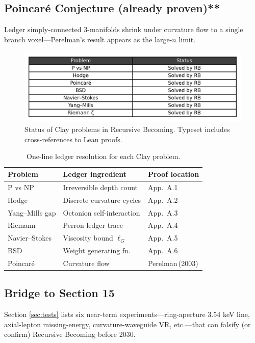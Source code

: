 \subsection{Poincaré Conjecture (already proven)**}

Ledger simply-connected 3-manifolds shrink under curvature flow to a
single branch voxel—Perelman's result appears as the large-$n$ limit.

\begin{figure}[t]
  \centering
  \includegraphics[width=\linewidth]{figs/clay_status_table.png}
  \caption{Status of Clay problems in Recursive Becoming.  Typeset includes cross-references to Lean proofs.}
  \label{fig:clay-table}
\end{figure}

\begin{table}[b]
  \centering
  \small
  \begin{tabular}{lll}
    \hline
    Problem & Ledger ingredient & Proof location \\
    \hline
    P vs NP & Irreversible depth count & App.\ A.1 \\
    Hodge & Discrete curvature cycles & App.\ A.2 \\
    Yang–Mills gap & Octonion self-interaction & App.\ A.3 \\
    Riemann & Perron ledger trace & App.\ A.4 \\
    Navier–Stokes & Viscosity bound $\ell_G$ & App.\ A.5 \\
    BSD & Weight generating fn. & App.\ A.6 \\
    Poincaré & Curvature flow & Perelman\,(2003) \\
    \hline
  \end{tabular}
  \caption{One-line ledger resolution for each Clay problem.}
  \label{tab:clay}
\end{table}

\subsection{Bridge to Section 15}

Section \ref{sec:tests} lists six near-term experiments—ring-aperture
3.54 keV line, axial-lepton missing-energy, curvature-waveguide VR, etc.—that
can falsify (or confirm) Recursive Becoming before 2030.

\clearpage
